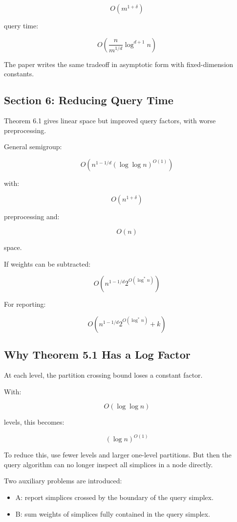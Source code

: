 \documentclass[
  11pt,
]{article}
\providecommand{\tightlist}{%
  \setlength{\itemsep}{0pt}\setlength{\parskip}{0pt}}
\begin{document}
\[
O(m^{1+\delta})
\]

query time:

\[
O\left(\frac{n}{m^{1/d}}\log^{d+1}n\right)
\]

The paper writes the same tradeoff in asymptotic form with
fixed-dimension constants.

\hypertarget{section-6-reducing-query-time}{%
\subsection{Section 6: Reducing Query
Time}\label{section-6-reducing-query-time}}

Theorem 6.1 gives linear space but improved query factors, with worse
preprocessing.

General semigroup:

\[
O(n^{1-1/d}(\log\log n)^{O(1)})
\]

with:

\[
O(n^{1+\delta})
\]

preprocessing and:

\[
O(n)
\]

space.

If weights can be subtracted:

\[
O(n^{1-1/d}2^{O(\log^\ast  n)})
\]

For reporting:

\[
O(n^{1-1/d}2^{O(\log^\ast  n)}+k)
\]

\hypertarget{why-theorem-5.1-has-a-log-factor}{%
\subsection{Why Theorem 5.1 Has a Log
Factor}\label{why-theorem-5.1-has-a-log-factor}}

At each level, the partition crossing bound loses a constant factor.

With:

\[
O(\log\log n)
\]

levels, this becomes:

\[
(\log n)^{O(1)}
\]

To reduce this, use fewer levels and larger one-level partitions. But
then the query algorithm can no longer inspect all simplices in a node
directly.

Two auxiliary problems are introduced:

\begin{itemize}
\tightlist
\item
  A: report simplices crossed by the boundary of the query simplex.
\item
  B: sum weights of simplices fully contained in the query simplex.
\end{itemize}
\end{document}
